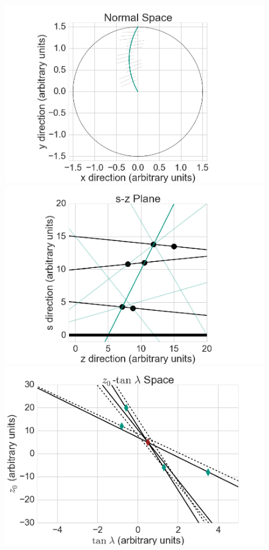 \begin{figure}
 \centering
 \includegraphics[scale=0.15]{figures/theory/stereo_1.png}
 \includegraphics[scale=0.15]{figures/theory/stereo_2.png}
 \includegraphics[scale=0.15]{figures/theory/stereo_3.png}

\end{figure}
